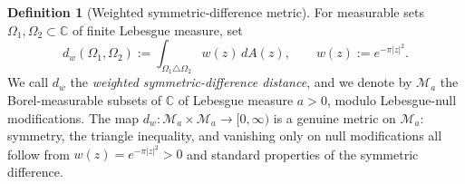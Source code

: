\documentclass[a4paper,11pt,reqno]{amsart}
\numberwithin{equation}{section}
\theoremstyle{plain} %
\theoremstyle{definition} %
\newtheorem{definition}{Definition}[section]
\theoremstyle{remark}
\newcommand{\C}{\mathbb{C}}
\begin{document}
\begin{definition}[Weighted symmetric-difference metric]\label{def:weighted-sym-diff}
For measurable sets \(\Omega_1,\Omega_2\subset \C\) of finite Lebesgue measure,
set
\begin{equation}\label{eq:weighted-sym-diff}
d_w(\Omega_1,\Omega_2)
:=
\int_{\Omega_1\triangle\Omega_2} w(z)\,dA(z),
\qquad
w(z):=e^{-\pi |z|^2}.
\end{equation}
We call \(d_w\) the \emph{weighted symmetric-difference distance}, and we denote
by \(\mathcal M_a\) the Borel-measurable subsets of \(\C\) of Lebesgue measure
\(a>0\), modulo Lebesgue-null modifications. The map
\(d_w\colon \mathcal M_a\times \mathcal M_a\to[0,\infty)\) is a genuine metric
on \(\mathcal M_a\): symmetry, the triangle inequality, and vanishing only on
null modifications all follow from \(w(z)=e^{-\pi|z|^2}>0\) and standard
properties of the symmetric difference.
\end{definition}
\end{document}
